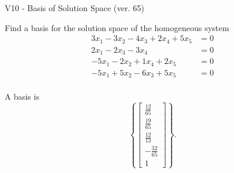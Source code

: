 \begin{exercise}
  \begin{exerciseTitle}V10 - Basis of Solution Space (ver. 65)\end{exerciseTitle}
  \begin{exerciseStatement}
    Find a basis for the solution space of the homogeneous system 
\begin{align*}
 3 x_ 1 -3 x_ 2 -4 x_ 3 + 2 x_ 4 + 5 x_ 5 &= 0  \\ 
  2 x_ 1 -2 x_ 3 -3 x_ 4 &= 0  \\ 
  -5 x_ 1 -2 x_ 2 + 1 x_ 4 + 2 x_ 5 &= 0  \\ 
  -5 x_ 1 + 5 x_ 2 -6 x_ 3 + 5 x_ 5 &= 0  \\ 
 \end{align*}


 
  \end{exerciseStatement}

  \begin{exerciseAnswer}
   A basis is   
\[\left\{\left[\begin{array}{c}
\frac{12}{65} \\
\frac{19}{65} \\
\frac{12}{13} \\
-\frac{32}{65} \\
1
\end{array}\right]\right\}.\]

  


  \end{exerciseAnswer}
\end{exercise}
